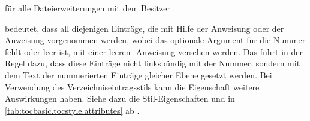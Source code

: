 \begin{description}
   für alle Dateierweiterungen mit 
  dem Besitzer .
\item[\PValue{numberline}] %
  bedeutet, dass all diejenigen Einträge, die mit Hilfe der Anweisung
   oder der Anweisung
   vorgenommen werden,
  wobei das optionale Argument für die Nummer fehlt oder leer ist, mit einer
  leeren -Anweisung versehen werden. Das
  führt in der Regel dazu, dass diese Einträge nicht linksbündig mit der
  Nummer, sondern mit dem Text der nummerierten Einträge gleicher Ebene
  gesetzt werden. Bei Verwendung des
  Verzeichniseintragsstils  kann die Eigenschaft weitere
  Auswirkungen haben. Siehe dazu die Stil-Eigenschaften
   und  in
  \autoref{tab:tocbasic.tocstyle.attributes} ab
  .


\end{description}
